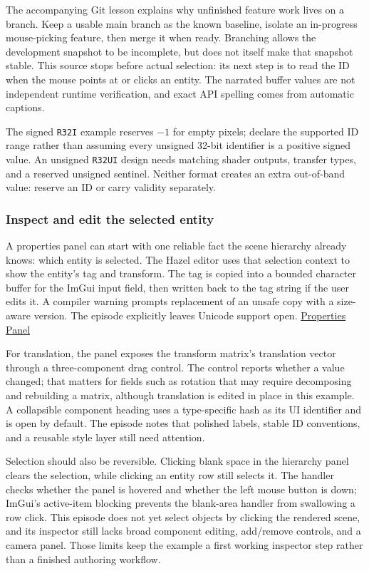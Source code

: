 The accompanying Git lesson explains why unfinished feature work lives on a branch. Keep a usable main branch as the known baseline, isolate an in-progress mouse-picking feature, then merge it when ready. Branching allows the development snapshot to be incomplete, but does not itself make that snapshot stable. This source stops before actual selection: its next step is to read the ID when the mouse points at or clicks an entity. The narrated buffer values are not independent runtime verification, and exact API spelling comes from automatic captions.

The signed \texttt{R32I} example reserves \(-1\) for empty pixels; declare the supported ID range rather than assuming every unsigned 32-bit identifier is a positive signed value. An unsigned \texttt{R32UI} design needs matching shader outputs, transfer types, and a reserved unsigned sentinel. Neither format creates an extra out-of-band value: reserve an ID or carry validity separately.

\subsubsection{Inspect and edit the selected entity}\label{inspect-and-edit-the-selected-entity}

A properties panel can start with one reliable fact the scene hierarchy already knows: which entity is selected. The Hazel editor uses that selection context to show the entity's tag and transform. The tag is copied into a bounded character buffer for the ImGui input field, then written back to the tag string if the user edits it. A compiler warning prompts replacement of an unsafe copy with a size-aware version. The episode explicitly leaves Unicode support open. \href{https://www.youtube.com/watch?v=NBpB0qscF3E}{Properties Panel}

For translation, the panel exposes the transform matrix's translation vector through a three-component drag control. The control reports whether a value changed; that matters for fields such as rotation that may require decomposing and rebuilding a matrix, although translation is edited in place in this example. A collapsible component heading uses a type-specific hash as its UI identifier and is open by default. The episode notes that polished labels, stable ID conventions, and a reusable style layer still need attention.

Selection should also be reversible. Clicking blank space in the hierarchy panel clears the selection, while clicking an entity row still selects it. The handler checks whether the panel is hovered and whether the left mouse button is down; ImGui's active-item blocking prevents the blank-area handler from swallowing a row click. This episode does not yet select objects by clicking the rendered scene, and its inspector still lacks broad component editing, add/remove controls, and a camera panel. Those limits keep the example a first working inspector step rather than a finished authoring workflow.


